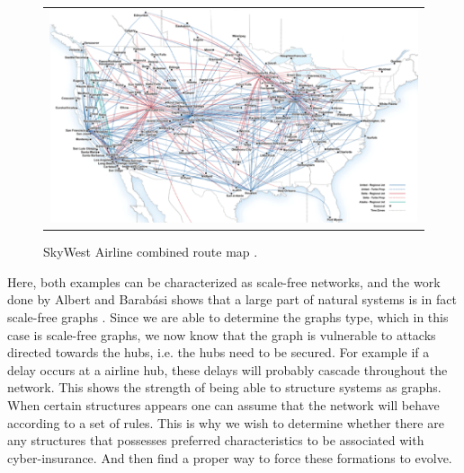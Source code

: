 \begin{figure}[h]
\centering
\begin{tabular}{@{}c@{}}
\includegraphics[width=1.0\textwidth]{../Figures/airlineRoutesUSA.png}
\end{tabular}
\caption[Caption for LOF]{SkyWest Airline combined route map \cite{airlineRoutes}.
\label{fig:airlineRouteMap}}
\end{figure}

Here, both examples can be characterized as scale-free networks, and the work done by Albert and Barabási shows that a large part of natural systems is in fact scale-free graphs \cite{audestad}. Since we are able to determine the graphs type, which in this case is scale-free graphs, we now know that the graph is vulnerable to attacks directed towards the hubs, i.e. the hubs need to be secured. For example if a delay occurs at a airline hub, these delays will probably cascade throughout the network.
This shows the strength of being able to structure systems as graphs. When certain structures appears one can assume that the network will behave according to a set of rules. This is why we wish to determine whether there are any structures that possesses preferred characteristics to be associated with cyber-insurance. And then find a proper way to force these formations to evolve.










